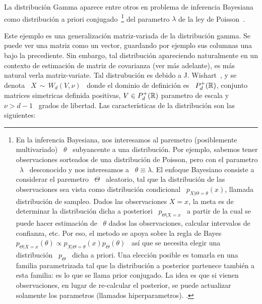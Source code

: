 La distribuci\'on Gamma aparece entre  otros en problema de inferencia Bayesiana
como distribuci\'on a priori conjugado~\footnote{En la inferencia Bayesiana, nos
  interesamos al paremetro (posiblemente  multivariado) \ $\theta$ \ subyancente
  a una  distribuci\'on. Por ejemplo,  sabemos tener observaciones  sorteados de
  una distribuci\'on de Poisson, pero con el parametro \ $\lambda$ \ desconocido
  y nos interesamos a \ $\theta \equiv \lambda$. El enfoque Bayesiano consiste a
  considerar el paremetro  \ $\Theta$ \ aleatorio, tal  que la distribuci\'on de
  las observaciones  sea vista como distribuci\'on condicional  \ $p_{X|\Theta =
    \theta}(x)$, llamada distribuci\'on de sampleo. Dados las observaciones $X =
  x$,  la  meta  es  de  determinar  la  distribuci\'on  dicha  a  posteriori  \
  $p_{\Theta|X =  x}$ \ a  partir de  la cual se  puede hacer estimaci\'on  de \
  $\theta$ dados  las observaciones, calcular intervalos de  confianza, etc. Por
  eso,  el metodo  se  apoya  sobre la  regla  de Bayes  $p_{\Theta|X=x}(\theta)
  \propto  p_{X|\Theta=\theta}(x)  p_\Theta(\theta)$  \  as\'i que  se  necesita
  elegir  una distribuci\'on  \ $p_\Theta$  \  dicha a  priori.  Una  elecci\'on
  posible es  tomarla en una familia  parametrizada tal que  la distribuci\'on a
  posterior  partenece  tambi\'en a  esta  familia: es  lo  que  se llama  prior
  conjugado. La idea es que si  vienen observaciones, en lugar de re-calcular el
  posterior,   se   puede   actualizar   solamente  los   parametros   (llamados
  hiperparametros).    \SZ{Ver    nota    de    pie    en    el    cap    2    a
    modificar}.\label{Foot:MP:BayesPrior} } del parametro $\lambda$ de la ley de
Poisson~\cite{Rob07}.





Este ejemplo es una  generalizaci\'on matriz-variada de la distribuci\'on gamma.
Se puede ver  una matriz como un vector, guardando por  ejemplo sus columnas una
bajo la  precediente.  Sin embargo, tal  distribuci\'on apareciendo naturalmente
en un contexto de estimaci\'on de  matriz de covarianza (ver m\'as adelante), es
m\'as  natural  verla  matriz-variate.    Tal  distrubuci\'on  es  debido  a  J.
Wishart~\cite{Wis28, GupNag99, And03}, y se denota \ $X \, \sim \, W_d(V,\nu)$ \
donde  el  dominio  de  definici\'on  es  \  $P_d^+(\mathbb{R})$,  conjunto  matrices
simetricas definida positivas, $V \in P_d^+(\mathbb{R})$ parametro de escala y \ $\nu
> d-1$ \ grados de libertad.  Las caracter\'isticas de la distribuci\'on son las
siguientes:

